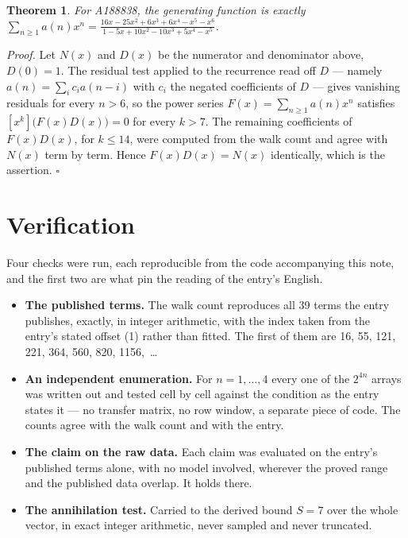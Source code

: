 \documentclass[11pt]{article}
\newtheorem{theorem}{Theorem}
\theoremstyle{definition}
\begin{document}
\begin{theorem} For A188838, the generating function is exactly $\sum_{n\ge 1} a(n)x^n = \frac{16x - 25x^{2} + 6x^{3} + 6x^{4} - x^{5} - x^{6}}{1 - 5x + 10x^{2} - 10x^{3} + 5x^{4} - x^{5}}$.\end{theorem}

{\itshape Proof.} Let $N(x)$ and $D(x)$ be the numerator and denominator above, $D(0)=1$. The residual test applied to the recurrence read off $D$ --- namely $a(n) = \sum_i c_i a(n-i)$ with $c_i$ the negated coefficients of $D$ --- gives vanishing residuals for every $n > 6$, so the power series $F(x)=\sum_{n\ge 1}a(n)x^n$ satisfies $[x^k]\bigl(F(x)D(x)\bigr) = 0$ for every $k > 7$. The remaining coefficients of $F(x)D(x)$, for $k \le 14$, were computed from the walk count and agree with $N(x)$ term by term. Hence $F(x)D(x) = N(x)$ identically, which is the assertion. $\square$

\section{Verification}

Four checks were run, each reproducible from the code accompanying this note, and the first two are what pin the reading of the entry's English.

\begin{itemize}

\item {\bfseries The published terms.} The walk count reproduces all 39 terms the entry publishes, exactly, in integer arithmetic, with the index taken from the entry's stated offset (1) rather than fitted. The first of them are 16, 55, 121, 221, 364, 560, 820, 1156,~\dots

\item {\bfseries An independent enumeration.} For $n = 1,\dots,4$ every one of the $2^{4n}$ arrays was written out and tested cell by cell against the condition as the entry states it --- no transfer matrix, no row window, a separate piece of code. The counts agree with the walk count and with the entry.

\item {\bfseries The claim on the raw data.} Each claim was evaluated on the entry's published terms alone, with no model involved, wherever the proved range and the published data overlap. It holds there.

\item {\bfseries The annihilation test.} Carried to the derived bound $S = 7$ over the whole vector, in exact integer arithmetic, never sampled and never truncated.

\end{itemize}
\end{document}
